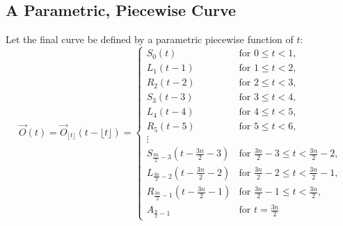 \documentclass{article}
\begin{document}
\subsection{A Parametric, Piecewise Curve}
\label{subsec:definition_of_curve}
Let the final curve be defined by a parametric piecewise function of $t$:
\[
\overrightarrow{O}(t) = \overrightarrow{O}_{\lfloor t \rfloor}(t - \lfloor t \rfloor) = \begin{cases}
S_0(t) & \text{for } 0 \leq t < 1, \\
L_1(t - 1) & \text{for } 1 \leq t < 2, \\
R_2(t - 2) & \text{for } 2 \leq t < 3, \\
S_3(t - 3) & \text{for } 3 \leq t < 4, \\
L_4(t - 4) & \text{for } 4 \leq t < 5, \\
R_5(t - 5) & \text{for } 5 \leq t < 6, \\
\vdots & \\
S_{\frac{3n}{2}-3}(t - \frac{3n}{2}-3) & \text{for } \frac{3n}{2}-3 \leq t < \frac{3n}{2}-2, \\
L_{\frac{3n}{2}-2}(t - \frac{3n}{2}-2) & \text{for } \frac{3n}{2}-2 \leq t < \frac{3n}{2}-1, \\
R_{\frac{3n}{2}-1}(t - \frac{3n}{2}-1) & \text{for } \frac{3n}{2}-1 \leq t < \frac{3n}{2}, \\
A_{\frac{n}{2}-1} & \text{for } t = \frac{3n}{2}
\end{cases}
\]
\end{document}
